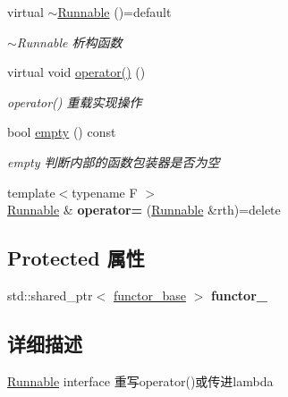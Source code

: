 \begin{DoxyCompactItemize}
\mbox{\label{classRunnable_a08557328273d2dfd3425507b1f972fcb}} 
virtual \hyperlink{classRunnable_a08557328273d2dfd3425507b1f972fcb}{$\sim$\+Runnable} ()=default
\begin{DoxyCompactList}\small\item\em $\sim$\+Runnable 析构函数 \end{DoxyCompactList}\item 
\mbox{\label{classRunnable_a38bf849dab4bbb86fc5bc6e7aff383e0}} 
virtual void \hyperlink{classRunnable_a38bf849dab4bbb86fc5bc6e7aff383e0}{operator()} ()
\begin{DoxyCompactList}\small\item\em operator() 重载实现操作 \end{DoxyCompactList}\item 
bool \hyperlink{classRunnable_a3abba14a5cf19709cef2d299ee68acae}{empty} () const
\begin{DoxyCompactList}\small\item\em empty 判断内部的函数包装器是否为空 \end{DoxyCompactList}\item 
\mbox{\label{classRunnable_a9950452d28eaf9a1eb385ae6ad4cbc9b}} 
{\footnotesize template$<$typename F $>$ }\\\hyperlink{classRunnable}{Runnable} \& {\bfseries operator=} (\hyperlink{classRunnable}{Runnable} \&rth)=delete
\end{DoxyCompactItemize}
\subsection*{Protected 属性}
\begin{DoxyCompactItemize}
\item 
\mbox{\label{classRunnable_a9bb8a251d9b7db3c422c576e994382f6}} 
std\+::shared\+\_\+ptr$<$ \hyperlink{structRunnable_1_1functor__base}{functor\+\_\+base} $>$ {\bfseries functor\+\_\+}
\end{DoxyCompactItemize}


\subsection{详细描述}
\hyperlink{classRunnable}{Runnable} interface 重写operator()或传进lambda 

